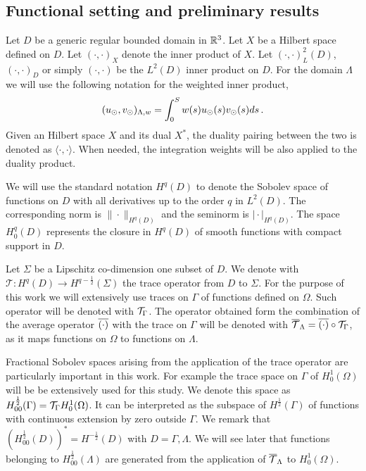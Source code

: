\documentclass[r]{siamart171218}
\begin{document}
\subsection{Functional setting and preliminary results}

Let $D$ be a generic regular bounded domain in $\mathbb{R}^3$. 
Let $X$ be a Hilbert space defined on $D$.
Let $(\cdot,\cdot)_X$ denote the inner product of $X$.
Let $(\cdot,\cdot)_L^2(D)$,  $(\cdot,\cdot)_D$ or simply $(\cdot,\cdot)$ be the $L^2(D)$ inner product on $D$.
For the domain $\Lambda$ we will use the following notation for the weighted inner product,
\begin{equation*}
(u_{\odot},v_{\odot})_{\Lambda,w} = \int_0^S w(s) u_{\odot}(s) v_{\odot}(s) ds\,.
\end{equation*}
Given an Hilbert space $X$ and its dual $X^*$, the duality pairing between the two is denoted as $\langle\cdot,\cdot\rangle$.
When needed, the integration weights will be also applied to the duality product.

We will use the standard notation $H^q(D)$ to denote the Sobolev space of functions on $D$ with all derivatives up to the order $q$ in $L^2(D)$.
The corresponding norm is $\|\cdot\|_{H^q(D)}$ and the seminorm is $\vert\cdot\vert_{H^q(D)}$.
The space $H^q_0(D)$ represents the closure in $H^q(D)$ of smooth functions with compact support in $D$.

Let $\Sigma$ be a Lipschitz co-dimension one subset of $D$. 
We denote with $\mathcal{T}: H^q(D) \rightarrow H^{q-\frac12}(\Sigma)$ the trace operator from $D$ to $\Sigma$.
For the purpose of this work we will extensively use traces on $\Gamma$ of functions defined on $\Omega$. Such operator will be denoted with ${\mathcal{T}_\Gamma}$. 
The operator obtained form the combination of the average operator $\overline{(\cdot)}$ with the trace on $\Gamma$ will be denoted with ${\overline{\mathcal{T}}_\Lambda} = \overline{(\cdot)} \circ {\mathcal{T}_\Gamma}$,
as it maps functions on $\Omega$ to functions on $\Lambda$.

Fractional Sobolev spaces arising from the application of the trace operator are particularly important in this work.
For example the trace space on $\Gamma$ of $H^1_0(\Omega)$ will be be extensively used for this study.
We denote this space as $H^{\frac12}_{00}(\Gamma) = {\mathcal{T}_\Gamma} H^1_0(\Omega)$.
It can be interpreted as the subspace of $H^{\frac12}(\Gamma)$ of functions with continuous extension by zero outside $\Gamma$.
We remark that $(H^{\frac12}_{00}(D))^* = H^{-\frac12}(D)$ with $D=\Gamma,\Lambda$.
We will see later that functions belonging to $H^{\frac12}_{00}(\Lambda)$ are generated from the application of ${\overline{\mathcal{T}}_\Lambda}$ to $H^1_0(\Omega)$.
\end{document}
